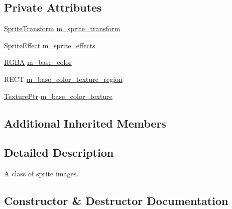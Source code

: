 \subsection*{Private Attributes}
\begin{DoxyCompactItemize}
\item 
\mbox{\hyperlink{classmage_1_1_sprite_transform}{Sprite\+Transform}} \mbox{\hyperlink{classmage_1_1rendering_1_1_sprite_image_a7985369471809a6efcdeb8a265510b7a}{m\+\_\+sprite\+\_\+transform}}
\item 
\mbox{\hyperlink{namespacemage_1_1rendering_a4dbc3536c87b906f1d41d863ec458e78}{Sprite\+Effect}} \mbox{\hyperlink{classmage_1_1rendering_1_1_sprite_image_a25891d2cfd1edd3dc86c0bc82700cad2}{m\+\_\+sprite\+\_\+effects}}
\item 
\mbox{\hyperlink{structmage_1_1_r_g_b_a}{R\+G\+BA}} \mbox{\hyperlink{classmage_1_1rendering_1_1_sprite_image_a9f17f78cd6731bc604daa2b4f2593435}{m\+\_\+base\+\_\+color}}
\item 
R\+E\+CT \mbox{\hyperlink{classmage_1_1rendering_1_1_sprite_image_a18de0a4473e2bfee074cd152d1ba2c3e}{m\+\_\+base\+\_\+color\+\_\+texture\+\_\+region}}
\item 
\mbox{\hyperlink{namespacemage_1_1rendering_a6f3ae54f825328465b0cdde0f0de4a36}{Texture\+Ptr}} \mbox{\hyperlink{classmage_1_1rendering_1_1_sprite_image_a1b68c232550bfc55aa794fcffbeab489}{m\+\_\+base\+\_\+color\+\_\+texture}}
\end{DoxyCompactItemize}
\subsection*{Additional Inherited Members}


\subsection{Detailed Description}
A class of sprite images. 

\subsection{Constructor \& Destructor Documentation}
\mbox{\label{classmage_1_1rendering_1_1_sprite_image_af49f06e0de889dbfd2db264d9e07fc20}} 
